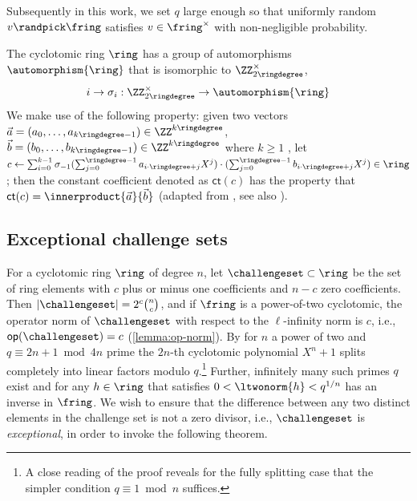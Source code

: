 Subsequently in this work, we set $q$ large enough so that uniformly random $v \randpick \fring$ satisfies $v \in \fring^\times$ with non-negligible probability.

\label{sec:automorphism}
The cyclotomic ring $\ring$ has a group of automorphisms $\automorphism{\ring}$ that is isomorphic to $\ZZ^\times_{2\ringdegree}$,
\[
i \to \sigma_i : \ZZ^\times_{2\ringdegree} \to \automorphism{\ring}
\]
We make use of the following property: given two vectors $\vec{a} = (a_0, \dots, a_{k\ringdegree - 1}) \in \ZZ^{k\ringdegree}$, $\vec{b} = (b_0, \dots, b_{k\ringdegree - 1}) \in \ZZ^{k\ringdegree}$ where $k \geq 1$   , let $c \gets \sum_{i = 0}^{k - 1} \sigma_{-1}(\sum_{j = 0}^{\ringdegree - 1} a_{i\cdot \ringdegree +j} X^j) \cdot (\sum_{j = 0}^{\ringdegree - 1} b _{i\cdot \ringdegree +j} X^j) \in \ring$; then the constant coefficient denoted as $\mathsf{ct}(c)$ has the property that $\mathsf{ct}(c) = \innerproduct{\vec{a}}{\vec{b}}$ (adapted from \cite[Lemma 2.4]{LNP22}, see also \cite{ENS20}).

\subsection{Exceptional challenge sets}
\label{sec:challenges}

For a cyclotomic ring $\ring$ of degree $n$, let $\challengeset \subset \ring$ be the set of ring elements with $c$ plus or minus one coefficients and $n-c$ zero coefficients. Then $\vert\challengeset\vert = 2^c \binom{n}{c}$, and if $\fring$ is a power-of-two cyclotomic, the operator norm of $\challengeset$ with respect to the $\ell$-infinity norm is $c$, i.e., $\mathsf{op}(\challengeset) = c$ (\cref{lemma:op-norm}). By \cite[Corollary 1.2]{ls20} for $n$ a power of two and $q \equiv 2n+1 \bmod 4n$ prime the $2n$-th cyclotomic polynomial $X^n+1$ splits completely into linear factors modulo $q$.\footnote{A close reading of the proof reveals for the fully splitting case that the simpler condition $q \equiv 1 \bmod n$ suffices.} Further, infinitely many such primes $q$ exist and for any $h \in \ring$ that satisfies $0 < \ltwonorm{h} < q^{1/n}$ has an inverse in $\fring$. We wish to ensure that the difference between any two distinct elements in the challenge set is not a zero divisor, i.e., $\challengeset$ is \emph{exceptional}, in order to invoke the following theorem.

